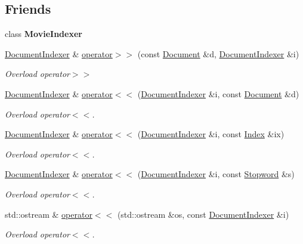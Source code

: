 \subsection*{Friends}
\begin{DoxyCompactItemize}
\item 
\mbox{\label{class_document_indexer_a0675564ad66cfa7f2eff3b44c1f1b2cc}} 
class {\bfseries Movie\+Indexer}
\item 
\hyperlink{class_document_indexer}{Document\+Indexer} \& \hyperlink{class_document_indexer_adf57f424618ad5604e84eac633f977e9}{operator$>$$>$} (const \hyperlink{class_document}{Document} \&d, \hyperlink{class_document_indexer}{Document\+Indexer} \&i)
\begin{DoxyCompactList}\small\item\em Overload operator$>$$>$ \end{DoxyCompactList}\item 
\hyperlink{class_document_indexer}{Document\+Indexer} \& \hyperlink{class_document_indexer_a6c2e084b73080867237d1637bc040d66}{operator$<$$<$} (\hyperlink{class_document_indexer}{Document\+Indexer} \&i, const \hyperlink{class_document}{Document} \&d)
\begin{DoxyCompactList}\small\item\em Overload operator$<$$<$. \end{DoxyCompactList}\item 
\hyperlink{class_document_indexer}{Document\+Indexer} \& \hyperlink{class_document_indexer_a82199a005a825421b7db05a3c2547180}{operator$<$$<$} (\hyperlink{class_document_indexer}{Document\+Indexer} \&i, const \hyperlink{class_index}{Index} \&ix)
\begin{DoxyCompactList}\small\item\em Overload operator$<$$<$. \end{DoxyCompactList}\item 
\hyperlink{class_document_indexer}{Document\+Indexer} \& \hyperlink{class_document_indexer_aadb77ccf09197d3adf55667f29672346}{operator$<$$<$} (\hyperlink{class_document_indexer}{Document\+Indexer} \&i, const \hyperlink{class_stopword}{Stopword} \&s)
\begin{DoxyCompactList}\small\item\em Overload operator$<$$<$. \end{DoxyCompactList}\item 
std\+::ostream \& \hyperlink{class_document_indexer_a09373f25959741150437b95f15ae11e2}{operator$<$$<$} (std\+::ostream \&os, const \hyperlink{class_document_indexer}{Document\+Indexer} \&i)
\begin{DoxyCompactList}\small\item\em Overload operator$<$$<$. \end{DoxyCompactList}\end{DoxyCompactItemize}
